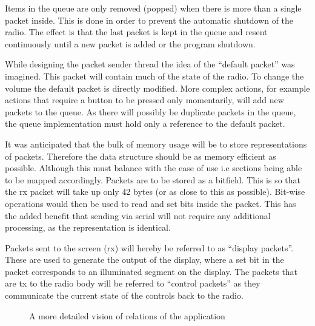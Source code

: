 Items in the queue are only removed (popped) when there is more than a single packet inside. This is done in order to prevent the automatic shutdown of the radio. The effect is that the last packet is kept in the queue and resent continuously until a new packet is added or the program shutdown. 

While designing the packet sender thread the idea of the ``default packet'' was imagined. This packet will contain much of the state of the radio. To change the volume the default packet is directly modified. More complex actions, for example actions that require a button to be pressed only momentarily, will add new packets to the queue. As there will possibly be duplicate packets in the queue, the queue implementation must hold only a reference to the default packet.

It was anticipated that the bulk of memory usage will be to store representations of packets. Therefore the data structure should be as memory efficient as possible. Although this must balance with the ease of use i.e sections being able to be mapped accordingly. Packets are to be stored as a bitfield. This is so that the \gls{rx} packet will take up only 42 bytes (or as close to this as possible). Bit-wise operations would then be used to read and set bits inside the packet. This has the added benefit that sending via serial will not require any additional processing, as the representation is identical.

Packets sent to the screen (\gls{rx}) will hereby be referred to as ``display packets''. These are used to generate the output of the display, where a set bit in the packet corresponds to an illuminated segment on the display. The packets that are \gls{tx} to the radio body will be referred to ``control packets'' as they communicate the current state of the controls back to the radio.

\begin{figure}[H]
\centering
    \caption[Overall architecture]{A more detailed vision of relations of the application}
    \label{overall_architecture}
\end{figure}

